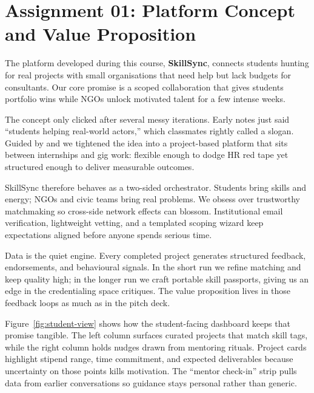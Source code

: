 \section*{Assignment 01: Platform Concept and Value Proposition}

The platform developed during this course, \textbf{SkillSync}, connects students hunting for real projects with small organisations that need help but lack budgets for consultants. Our core promise is a scoped collaboration that gives students portfolio wins while NGOs unlock motivated talent for a few intense weeks.

The concept only clicked after several messy iterations. Early notes just said ``students helping real-world actors,'' which classmates rightly called a slogan. Guided by \citet{Choudary2016} and \citet{Srnicek2017} we tightened the idea into a project-based platform that sits between internships and gig work: flexible enough to dodge HR red tape yet structured enough to deliver measurable outcomes.

SkillSync therefore behaves as a two-sided orchestrator. Students bring skills and energy; NGOs and civic teams bring real problems. We obsess over trustworthy matchmaking so cross-side network effects can blossom. Institutional email verification, lightweight vetting, and a templated scoping wizard keep expectations aligned before anyone spends serious time.

Data is the quiet engine. Every completed project generates structured feedback, endorsements, and behavioural signals. In the short run we refine matching and keep quality high; in the longer run we craft portable skill passports, giving us an edge in the credentialing space \citet{Zuboff2019} critiques. The value proposition lives in those feedback loops as much as in the pitch deck.

Figure~\ref{fig:student-view} shows how the student-facing dashboard keeps that promise tangible. The left column surfaces curated projects that match skill tags, while the right column holds nudges drawn from mentoring rituals. Project cards highlight stipend range, time commitment, and expected deliverables because uncertainty on those points kills motivation. The ``mentor check-in'' strip pulls data from earlier conversations so guidance stays personal rather than generic.

